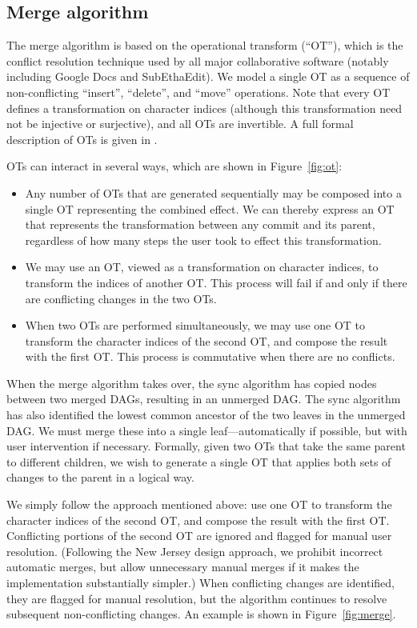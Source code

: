 \documentclass[11pt,titlepage]{article}
\begin{document}
\subsection{Merge algorithm}
\label{sec:merge}

The merge algorithm is based on the operational transform (``OT''),
which is the conflict resolution technique used by all major
collaborative software (notably including Google Docs and
SubEthaEdit).  We model a single OT as a sequence of non-conflicting
``insert'', ``delete'', and ``move'' operations.  Note that every OT
defines a transformation on character indices (although this
transformation need not be injective or surjective), and all OTs are
invertible.  A full formal description of OTs is given in \cite{wave}.

OTs can interact in several ways, which are shown in
Figure~\ref{fig:ot}:
\begin{itemize}
\item Any number of OTs that are generated sequentially may be
  composed into a single OT representing the combined effect.  We can
  thereby express an OT that represents the transformation between any
  commit and its parent, regardless of how many steps the user took to
  effect this transformation.
\item We may use an OT, viewed as a transformation on character
  indices, to transform the indices of another OT.  This process will
  fail if and only if there are conflicting changes in the two OTs.
\item When two OTs are performed simultaneously, we may use one OT to
  transform the character indices of the second OT, and compose the
  result with the first OT.  This process is commutative when there
  are no conflicts.
\end{itemize}

When the merge algorithm takes over, the sync algorithm has copied
nodes between two merged DAGs, resulting in an unmerged DAG.  The sync
algorithm has also identified the lowest common ancestor of the two
leaves in the unmerged DAG.  We must merge these into a single
leaf---automatically if possible, but with user intervention if
necessary. Formally, given two OTs that take the same parent to
different children, we wish to generate a single OT that applies both
sets of changes to the parent in a logical way.

We simply follow the approach mentioned above: use one OT to transform
the character indices of the second OT, and compose the result with
the first OT.  Conflicting portions of the second OT are ignored and
flagged for manual user resolution.  (Following the New Jersey design
approach, we prohibit incorrect automatic merges, but allow
unnecessary manual merges if it makes the implementation substantially
simpler.)  When conflicting changes are identified, they are flagged
for manual resolution, but the algorithm continues to resolve
subsequent non-conflicting changes.  An example is shown in
Figure~\ref{fig:merge}.
\end{document}
